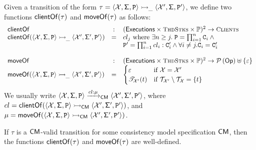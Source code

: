 \begin{definition}
Given a transition of the form $\tau = \langle \mathcal{X}, \mathsf{\Sigma}, \texttt{P} \rangle \rightarrowtail_{\_} 
\langle \mathcal{X}', \mathsf{\Sigma}, \texttt{P}' \rangle$, we define 
two functions $\mathsf{clientOf}(\tau)$ and $\mathsf{moveOf}(\tau)$ as follows: 
\[
\begin{array}{lcl}
\transclient &:& (\aeset \times \ThdStacks \times \progset)^{2} \rightarrow \Clients\\
\transclient(\langle \aexec, \thdstackFun, \prog \rangle \absrightarrow_{\_} 
\langle \aexec', \thdstackFun', \prog' \rangle) &=& \tid_{j} 
\text{ where } \exists n \geq j.\; \prog = \prod_{i=1}^{n} \cmd_{i} \wedge {}\\
&& \prog' = \prod_{i=1}^{n} \tid_{i}: \cmd'_{i} 
\wedge \forall i \neq j. \cmd_i = \cmd'_i\\
&&\\
\transmove &:& (\aeset \times \ThdStacks \times \progset)^{2} \rightarrow \powerset{\Op} \uplus \{\varepsilon\}\\
\transmove(\langle \aexec, \thdstackFun, \prog \rangle \absrightarrow_{\_} 
\langle \aexec', \thdstackFun', \prog' \rangle) &=& 
\begin{cases}
\varepsilon & \text{if } \aexec = \aexec' \\
\TtoOp{T}_{\aexec'}(\tsid) &\text{if } \T_{\aexec'} \setminus \T_{\aexec} = \{\tsid\}
\end{cases}
\end{array}
\]
We usually write $\langle \mathcal{X}, \mathsf{\Sigma}, \texttt{P} \rangle \xrightarrow{cl: \mu}_{\mathsf{CM}} 
\langle \mathcal{X}', \mathsf{\Sigma}', \texttt{P}' \rangle$, where
$cl = \mathsf{clientOf}(\langle \mathcal{X}, \mathsf{\Sigma}, \texttt{P} \rangle \rightarrowtail_{\mathsf{CM}} 
\langle \mathcal{X}', \mathsf{\Sigma}', \texttt{P}' \rangle)$, and 
$\mu = \mathsf{moveOf}(\langle \mathcal{X}, \mathsf{\Sigma}, \texttt{P} \rangle \rightarrowtail_{\mathsf{CM}} 
\langle \mathcal{X}', \mathsf{\Sigma}', \texttt{P}' \rangle)$.
\end{definition}

\begin{proposition}
If $\tau$ is a $\mathsf{CM}$-valid transition for some consistency model specification $\mathsf{CM}$, 
then the functions $\mathsf{clientOf}(\tau)$ 
and $\mathsf{moveOf}(\tau)$ are well-defined.
\end{proposition}

